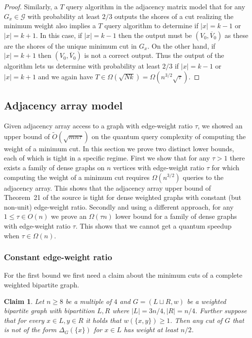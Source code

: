 \documentclass[10pt,a4paper]{article}
\newcommand{\Gcal}{\mathcal{G}}
\newcommand{\tO}{\tilde O}
\newcommand{\1}{\mathbf{1}}
\newtheorem{claim}[theorem]{Claim}
\theoremstyle{definition}
\begin{document}
\begin{proof}
Similarly, a $T$ query algorithm in the adjacency matrix model that for any $G_x \in \Gcal$ with probability at least $2/3$ outputs the shores of a cut realizing the minimum weight 
also implies a $T$ query algorithm to determine if $|x| = k-1$ or $|x| = k+1$.  In this case, if $|x| = k-1$ then the output must be $(V_0, \overline{V}_0)$ as these are the shores of the unique 
minimum cut in $G_x$.  On the other hand, if $|x| = k+1$ then $(V_0, \overline{V}_0)$ is not a correct output.  Thus the output of the algorithm lets us determine with probability at least $2/3$ if 
$|x| = k-1$ or $|x| = k+1$ and we again have $T \in \Omega(\sqrt{N k}) = \Omega(n^{3/2}\sqrt{\tau})$.
\end{proof}

\subsection{Adjacency array model}
Given adjacency array access to a graph with edge-weight ratio $\tau$, we showed an upper bound of $\tO(\sqrt{m n \tau})$ on the quantum query complexity of computing the weight of a minimum cut.
In this section we prove two distinct lower bounds, each of which is tight in a specific regime.
First we show that for any $\tau > 1$ there exists a family of dense graphs on $n$ vertices with edge-weight ratio $\tau$ for which computing the weight of a minimum cut requires $\Omega(n^{3/2})$ queries to the adjacency array.
This shows that the adjacency array upper bound of Theorem~21 of the source is tight for dense weighted graphs with constant (but non-unit) edge-weight ratio.
Secondly and using a different approach, for any $1 \leq \tau \in O(n)$ we prove an $\Omega(\tau n)$ lower bound for a family of dense graphs with edge-weight ratio $\tau$.
This shows that we cannot get a quantum speedup when $\tau \in \Omega(n)$.

\subsubsection{Constant edge-weight ratio}

For the first bound we first need a claim about the minimum cuts of a complete weighted bipartite graph.
\begin{claim}
\label{clm:complete_bipartite}
Let $n \ge 8$ be a multiple of $4$ and $G=(L \sqcup R,w)$ be a weighted bipartite graph with bipartition $L,R$ where $|L| = 3n/4, |R| = n/4$. Further suppose that 
for every $x \in L, y \in R$ it holds that $w(\{x,y\}) \ge 1$.   Then any cut of $G$ that is not of the form $\Delta_G(\{x\})$ for $x \in L$ has weight at least $n/2$.  
\end{claim}
\end{document}
